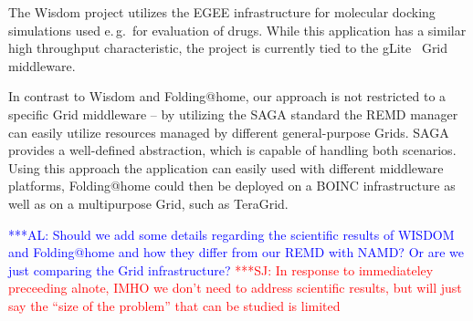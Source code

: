 \documentclass[times, 10pt, twocolumn]{article}
\newcommand{\kimnote}[1]{ {\textcolor{green} { ***JK: #1 }}}
\newcommand{\alnote}[1]{ {\textcolor{blue} { ***AL: #1 }}}
\newcommand{\jhanote}[1]{ {\textcolor{red} { ***SJ: #1 }}}
\newcommand{\kimnote}[1]{}
\newcommand{\alnote}[1]{}
\newcommand{\jhanote}[1]{}
\begin{document}

The Wisdom project utilizes the EGEE infrastructure for molecular
docking simulations used e.\,g.\ for evaluation of drugs. While this
application has a similar high throughput characteristic, the project
is currently tied to the gLite~\cite{glite2008} Grid middleware.


In contrast to Wisdom and Folding@home, our approach is not restricted
to a specific Grid middleware -- by utilizing the SAGA standard the
REMD manager can easily utilize resources managed by different
general-purpose Grids.  SAGA provides a well-defined abstraction,
which is capable of handling both scenarios. Using this approach the
application can easily used with different middleware platforms,
Folding@home could then be deployed on a BOINC infrastructure as well
as on a multipurpose Grid, such as TeraGrid.

\alnote{Should we add some details regarding the scientific results of
  WISDOM and Folding@home and how they differ from our REMD with NAMD?
  Or are we just comparing the Grid infrastructure?}  \jhanote{In
  response to immediateley preceeding alnote, IMHO we don't need to
  address scientific results, but will just say the ``size of the
  problem'' that can be studied is limited}

% 
\end{document}
